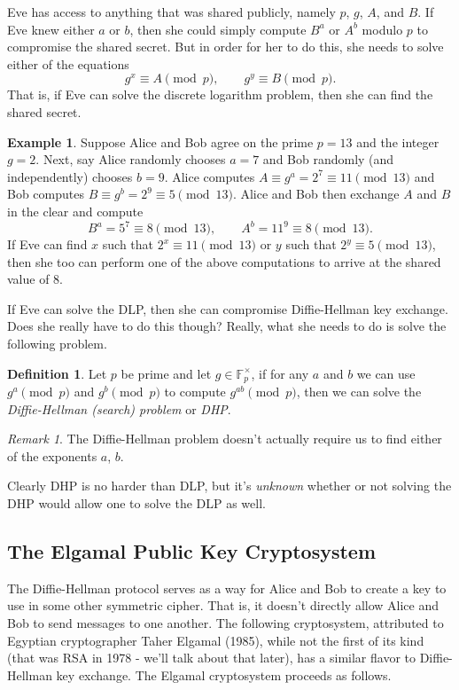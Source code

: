 \documentclass[12pt]{article}
\theoremstyle{plain}
\theoremstyle{definition}
\newtheorem{definition}[theorem]{Definition}
\newtheorem{example}[theorem]{Example}
\theoremstyle{remark}
\newtheorem{remark}[theorem]{Remark}
\newcommand{\F}{\mathbb{F}}
\begin{document}
Eve has access to anything that was shared publicly, namely $p$, $g$, $A$, and $B$.
If Eve knew either $a$ or $b$, then she could simply compute $B^a$ or $A^b$ modulo $p$ to compromise the shared secret.
But in order for her to do this, she needs to solve either of the equations
\[
    g^x \equiv A\pmod p,\qquad g^y\equiv B\pmod p.
\]
That is, if Eve can solve the discrete logarithm problem, then she can find the shared secret.

\begin{example}
    Suppose Alice and Bob agree on the prime $p=13$ and the integer $g = 2$.
    Next, say Alice randomly chooses $a=7$ and Bob randomly (and independently) chooses $b = 9$.
    Alice computes $A\equiv g^a = 2^7 \equiv 11\pmod{13}$ and Bob computes $B\equiv g^b = 2^9 \equiv 5\pmod {13}$.
    Alice and Bob then exchange $A$ and $B$ in the clear and compute
    \[
        B^a = 5^7\equiv 8\pmod {13},\qquad A^b = 11^9\equiv 8\pmod {13}.
    \]
    If Eve can find $x$ such that $2^x\equiv 11\pmod {13}$ or $y$ such that $2^y\equiv 5\pmod{13}$, then she too can perform one of the above computations to arrive at the shared value of 8.
\end{example}

If Eve can solve the DLP, then she can compromise Diffie-Hellman key exchange.
Does she really have to do this though?
Really, what she needs to do is solve the following problem.

\begin{definition}
    Let $p$ be prime and let $g\in \F_p^\times$, if for any $a$ and $b$ we can use $g^a\pmod p$ and $g^b\pmod p$ to compute $g^{ab}\pmod p$, then we can solve the \emph{Diffie-Hellman (search) problem} or \emph{DHP}.
\end{definition}

\begin{remark}
    The Diffie-Hellman problem doesn't actually require us to find either of the exponents $a$, $b$.
\end{remark}
Clearly DHP is no harder than DLP, but it's \emph{unknown} whether or not solving the DHP would allow one to solve the DLP as well.








\subsection{The Elgamal Public Key Cryptosystem}
The Diffie-Hellman protocol serves as a way for Alice and Bob to create a key to use in some other symmetric cipher.
That is, it doesn't directly allow Alice and Bob to send messages to one another.
The following cryptosystem, attributed to Egyptian cryptographer Taher Elgamal (1985), while not the first of its kind (that was RSA in 1978 - we'll talk about that later), has a similar flavor to Diffie-Hellman key exchange.
The Elgamal cryptosystem proceeds as follows.
\end{document}
